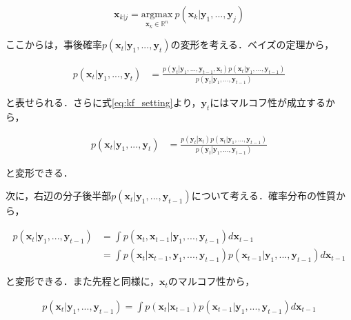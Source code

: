 \begin{equation}
    \label{eq:kalman_map}
    \bm{x}_{k|j} = \underset{\bm{x}_k \in \mathbb{R}^{n}}{\textrm{argmax}}\ p(\left. \bm{x}_k \right| \bm{y}_1,..., \bm{y}_j )
\end{equation}

ここからは，事後確率$p(\left. \bm{x}_t \right| \bm{y}_1,..., \bm{y}_t )$の変形を考える．ベイズの定理から，

\begin{equation}
    \begin{aligned}
        p(\left. \bm{x}_t \right| \bm{y}_1,..., \bm{y}_t ) &= \frac{p(\left. \bm{y}_t \right| \bm{y}_1,..., \bm{y}_{t-1}, \bm{x}_t) p(\left.\bm{x}_t\right| \bm{y}_1,..., \bm{y}_{t-1})}{p(\left.\bm{y}_t\right| \bm{y}_1,..., \bm{y}_{t-1})}
    \end{aligned}
\end{equation}

と表せられる．さらに式\ref{eq:kf_setting}より，$\bm{y}_t$にはマルコフ性が成立するから，

\begin{equation}
    \label{eq:filtering}
    \begin{aligned}
        p(\left. \bm{x}_t \right| \bm{y}_1,..., \bm{y}_t ) &= \frac{p(\left. \bm{y}_t \right| \bm{x}_t) p(\left.\bm{x}_t\right| \bm{y}_1,..., \bm{y}_{t-1})}{p(\left.\bm{y}_t\right| \bm{y}_1,..., \bm{y}_{t-1})}
    \end{aligned}
\end{equation}

と変形できる．
\par 
次に，右辺の分子後半部$p(\left.\bm{x}_t\right| \bm{y}_1,..., \bm{y}_{t-1})$について考える．確率分布の性質から，

\begin{equation}
    \begin{aligned}
        p(\left.\bm{x}_t\right| \bm{y}_1,..., \bm{y}_{t-1}) &= \int p(\left.\bm{x}_t, \bm{x}_{t-1}\right| \bm{y}_1,..., \bm{y}_{t-1}) d\bm{x}_{t-1}
        \\ &= \int p(\left.\bm{x}_t\right|\bm{x}_{t-1}, \bm{y}_1,..., \bm{y}_{t-1}) p(\left.\bm{x}_{t-1}\right| \bm{y}_1,..., \bm{y}_{t-1}) d\bm{x}_{t-1}
    \end{aligned}
\end{equation}

と変形できる．また先程と同様に，$\bm{x}_t$のマルコフ性から，

\begin{equation}
    \label{eq:updating}
    \begin{aligned}
        p(\left.\bm{x}_t\right| \bm{y}_1,..., \bm{y}_{t-1}) = \int p(\left.\bm{x}_t\right|\bm{x}_{t-1}) p(\left.\bm{x}_{t-1}\right| \bm{y}_1,..., \bm{y}_{t-1}) d\bm{x}_{t-1}
    \end{aligned}
\end{equation}

